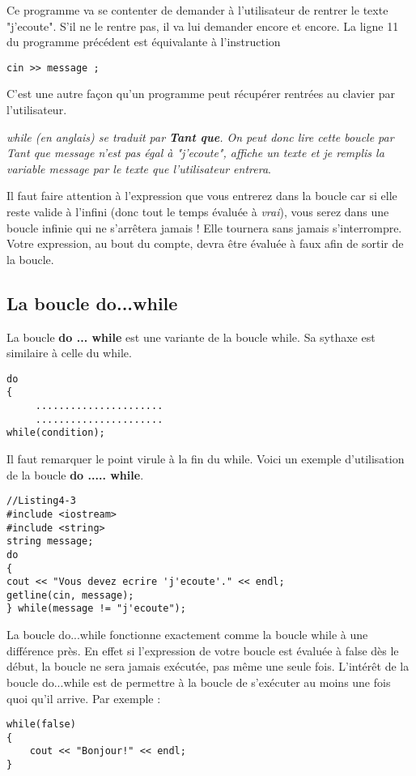 \documentclass[a4paper, oneside,11pt]{book}
\begin{document}
Ce programme va se contenter de demander \`a l'utilisateur de rentrer le texte "j'ecoute". S'il ne le
rentre pas, il va lui demander encore et encore.  La ligne 11 du programme pr\'ec\'edent est \'equivalante \`a l'instruction

\begin{lstlisting}
cin >> message ;
\end{lstlisting}
C'est une autre fa\c{c}on qu'un programme peut r\'ecup\'erer rentr\'ees au clavier par 
l'utilisateur. 

\emph {while (en anglais) se traduit par \textbf{Tant que}. On peut donc lire cette boucle par Tant que message n'est pas \'egal \`a "j'ecoute", affiche un texte et je remplis la variable message 
par le texte que l'utilisateur entrera}.

Il faut faire attention \`a l'expression que vous entrerez dans la boucle car si elle reste valide \`a l'infini (donc tout le temps \'evalu\'ee \`a \textit{vrai}), vous serez 
dans une boucle infinie qui ne s'arr\^etera jamais ! Elle tournera sans jamais
s'interrompre. Votre expression, au bout du compte, devra \^etre \'evalu\'ee 
\`a faux afin de sortir de la boucle.


\subsection{La boucle do...while}

La boucle \textbf{do ... while } est une variante de la boucle while. Sa sythaxe est similaire \`a celle du while.

\begin{lstlisting}
do
{
     ......................
     ......................
while(condition);
\end{lstlisting}
Il faut remarquer le point virule \`a la fin du while. Voici un exemple d'utilisation de la boucle \textbf{do ..... while}.


\begin{lstlisting}
//Listing4-3
#include <iostream>
#include <string>
string message;
do
{
cout << "Vous devez ecrire 'j'ecoute'." << endl;
getline(cin, message);
} while(message != "j'ecoute");
\end{lstlisting}
La boucle do...while fonctionne exactement comme la boucle while \`a une diff\'erence pr\`es. En
effet si l'expression de votre boucle est \'evalu\'ee \`a false d\`es le d\'ebut, la boucle ne sera jamais ex\'ecut\'ee,
pas m\^eme une seule fois. L'int\'er\^et de la boucle do...while est de permettre \`a la boucle de
s'ex\'ecuter au moins une fois quoi qu'il arrive. Par exemple :
\begin{lstlisting}
while(false)
{
    cout << "Bonjour!" << endl;
}
\end{lstlisting}
\end{document}
